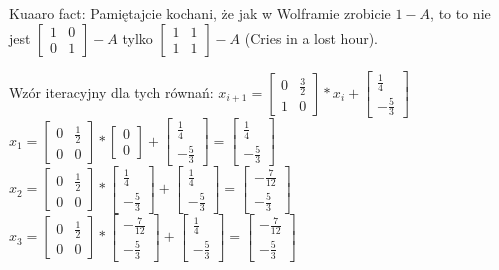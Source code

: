 \documentclass{article}
\begin{document}
Kuaaro fact: Pamiętajcie kochani, że jak w Wolframie zrobicie $1-A$, to to nie jest $\begin{bmatrix} 1 & 0 \\ 0 & 1 \end{bmatrix} - A$ tylko $\begin{bmatrix} 1 & 1 \\ 1 & 1 \end{bmatrix} - A$ (Cries in a lost hour).

Wzór iteracyjny dla tych równań: $x_{i+1}=\begin{bmatrix} 0 & \frac{3}{2} \\ 1 & 0 \end{bmatrix}*x_i+\begin{bmatrix} \frac{1}{4} \\ -\frac{5}{3} \end{bmatrix}$\\
$x_1=\begin{bmatrix} 0 & \frac{1}{2} \\ 0 & 0 \end{bmatrix}*\begin{bmatrix} 0 \\ 0 \end{bmatrix}+\begin{bmatrix} \frac{1}{4} \\ -\frac{5}{3} \end{bmatrix} = \begin{bmatrix} \frac{1}{4} \\ -\frac{5}{3} \end{bmatrix}$\\
$x_2=\begin{bmatrix} 0 & \frac{1}{2} \\ 0 & 0 \end{bmatrix}*\begin{bmatrix} \frac{1}{4} \\ -\frac{5}{3} \end{bmatrix}+\begin{bmatrix} \frac{1}{4} \\ -\frac{5}{3} \end{bmatrix} = \begin{bmatrix} -\frac{7}{12} \\ -\frac{5}{3} \end{bmatrix}$\\
$x_3=\begin{bmatrix} 0 & \frac{1}{2} \\ 0 & 0 \end{bmatrix}*\begin{bmatrix} -\frac{7}{12} \\ -\frac{5}{3} \end{bmatrix}+\begin{bmatrix} \frac{1}{4} \\ -\frac{5}{3} \end{bmatrix} = \begin{bmatrix} -\frac{7}{12} \\ -\frac{5}{3} \end{bmatrix}$\\
\end{document}
